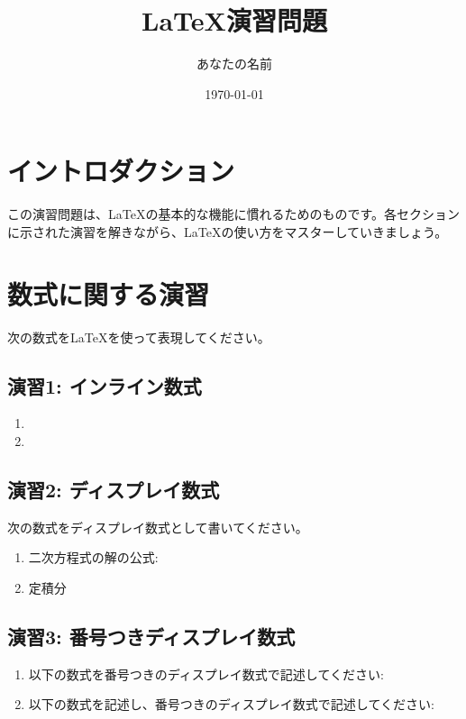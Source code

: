 \documentclass[a4paper,12pt]{article}
\title{LaTeX演習問題}
\author{あなたの名前}
\date{\today}
\begin{document}
\maketitle
\tableofcontents

\newpage

\section{イントロダクション}

この演習問題は、LaTeXの基本的な機能に慣れるためのものです。各セクションに示された演習を解きながら、LaTeXの使い方をマスターしていきましょう。

\section{数式に関する演習}

次の数式をLaTeXを使って表現してください。

\subsection{演習1: インライン数式}
\begin{enumerate}
\item 

\item 
\end{enumerate}

\subsection{演習2: ディスプレイ数式}

次の数式をディスプレイ数式として書いてください。
\begin{enumerate}
    \item 二次方程式の解の公式:


    \item 定積分

\end{enumerate}

\subsection{演習3: 番号つきディスプレイ数式}
\begin{enumerate}
\item 以下の数式を番号つきのディスプレイ数式で記述してください:


\item 以下の数式を記述し、番号つきのディスプレイ数式で記述してください:

\end{enumerate}
\end{document}

